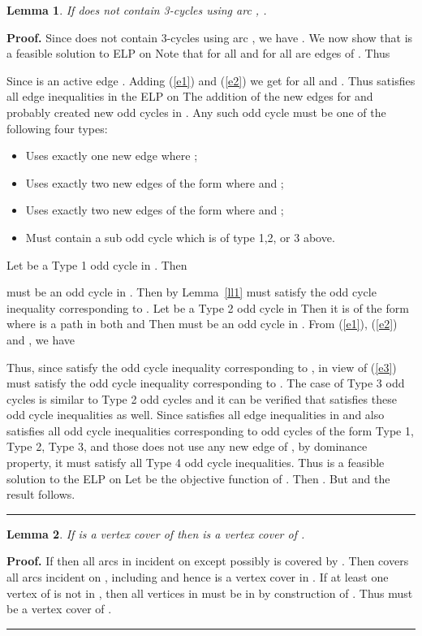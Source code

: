 \documentclass[12pt]{article}
\newtheorem{lemma}{Lemma}
\newenvironment{proof}[1][Proof]{\textbf{#1.} }{\ \rule{0.5em}{0.5em}}
\begin{document}
\begin{lemma}\label{a1} If  does not contain 3-cycles using arc , .\end{lemma}
\begin{proof}Since  does not contain 3-cycles using arc , we have . We now show that
 is a feasible solution to ELP
on  Note that  for all  and  for
all  are edges of . Thus

Since  is an active edge
. Adding (\ref{e1}) and (\ref{e2}) we get
 for all  and
. Thus  satisfies all edge inequalities in the
ELP on  The addition of the new edges  for
 and  probably created new odd cycles in
. Any such odd cycle must be one of the following four
types:
\begin{itemize}
\item[Type 1:] Uses exactly one new edge  where ;
\item[Type 2:] Uses exactly two new edges of the form 
where  and ;
\item[Type 3:] Uses exactly two new edges of the form 
where  and ;
\item[Type 4:] Must contain a sub odd cycle which is of type 1,2, or
3 above.
\end{itemize}


Let  be a Type 1 odd cycle in .  Then

must be an odd cycle in . Then by Lemma~\ref{ll1}  must
satisfy the odd cycle inequality corresponding to . Let
 be a Type 2 odd cycle in  Then it is of the
form  where
 is a path in both  and   Then
 must be an odd cycle in . From
(\ref{e1}), (\ref{e2}) and  , we have

Thus, since  satisfy the odd cycle inequality
corresponding to , in view of (\ref{e3})
 must satisfy the odd cycle inequality corresponding to
. The case of Type 3 odd cycles is similar to Type 2 odd
cycles and it can be verified that  satisfies these odd
cycle inequalities as well. Since  satisfies all edge
inequalities in  and also satisfies all odd cycle
inequalities corresponding to odd cycles of the form Type 1, Type 2,
Type 3, and those does not use any new edge of , by
dominance property, it must satisfy all Type 4 odd cycle
inequalities. Thus   is a feasible solution to the ELP on
 Let  be the objective function of .
Then . But  and the result
follows.\end{proof}

\vskip 0.7cm


\begin{lemma}If  is a vertex cover of
 then is a vertex cover of .
\end{lemma}
\begin{proof} If
 then all arcs in  incident on  except
possibly  is covered by . Then  covers
all arcs incident on , including  and hence  is a
vertex cover in . If at least one vertex of  is not in ,
then all vertices in  must be in  by construction of
. Thus  must be a vertex cover of .
\end{proof}
\vskip 9pt
\end{document}
